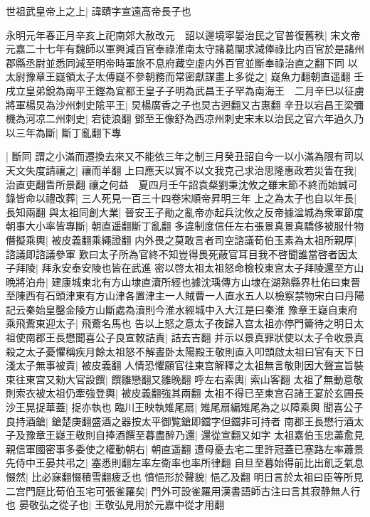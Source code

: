 世祖武皇帝上之上|{
	諱賾字宣遠高帝長子也}


永明元年春正月辛亥上祀南郊大赦改元　詔以邊境寜晏治民之官普復舊秩|{
	宋文帝元嘉二十七年有魏師以軍興減百官奉祿淮南太守諸葛闡求減俸祿比内百官於是諸州郡縣丞尉並悉同減至明帝時軍旅不息府藏空虛内外百官並斷奉祿治直之翻下同}
以太尉豫章王嶷領太子太傅嶷不參朝務而常密獻謀畫上多從之|{
	嶷魚力翻朝直遥翻}
壬戌立皇弟銳為南平王鏗為宜都王皇子子明為武昌王子罕為南海王　二月辛巳以征虜將軍楊炅為沙州刺史隂平王|{
	炅楊廣香之子也炅古迥翻又古惠翻}
辛丑以宕昌王梁彌機為河凉二州刺史|{
	宕徒浪翻}
鄧至王像舒為西凉州刺史宋末以治民之官六年過久乃以三年為斷|{
	斷丁亂翻下專}


|{
	斷同}
謂之小滿而遷換去來又不能依三年之制三月癸丑詔自今一以小滿為限有司以天文失度請禳之|{
	禳而羊翻}
上曰應天以實不以文我克己求治思隆惠政若災眚在我|{
	治直吏翻眚所景翻}
禳之何益　夏四月壬午詔袁粲劉秉沈攸之雖末節不終而始誠可錄皆命以禮改葬|{
	三人死見一百三十四卷宋順帝昇明三年}
上之為太子也自以年長|{
	長知兩翻}
與太祖同創大業|{
	晉安王子勛之亂帝亦起兵沈攸之反帝據湓城為衆軍節度}
朝事大小率皆專斷|{
	朝直遥翻斷丁亂翻}
多違制度信任左右張景真景真驕侈被服什物僭擬乘輿|{
	被皮義翻乘繩證翻}
内外畏之莫敢言者司空諮議荀伯玉素為太祖所親厚|{
	諮議即諮議參軍}
歎曰太子所為官終不知豈得畏死蔽官耳目我不啓聞誰當啓者因太子拜陵|{
	拜永安泰安陵也皆在武進}
密以啓太祖太祖怒命檢校東宫太子拜陵還至方山晩將泊舟|{
	建康城東北有方山埭直瀆所經也據沈瑀傳方山埭在湖熟縣界杜佑曰東晉至陳西有石頭津東有方山津各置津主一人賊曹一人直水五人以檢察禁物宋白曰丹陽記云秦始皇鑿金陵方山斷處為瀆則今淮水經城中入大江是曰秦淮}
豫章王嶷自東府乘飛鷰東迎太子|{
	飛鷰名馬也}
告以上怒之意太子夜歸入宫太祖亦停門籥待之明日太祖使南郡王長懋聞喜公子良宣敇詰責|{
	詰去吉翻}
并示以景真罪狀使以太子令收景真殺之太子憂懼稱疾月餘太祖怒不解晝卧太陽殿王敬則直入叩頭啟太祖曰官有天下日淺太子無事被責|{
	被皮義翻}
人情恐懼願官往東宫解釋之太祖無言敬則因大聲宣旨裝束往東宫又勑大官設饌|{
	饌雛戀翻又雛晚翻}
呼左右索輿|{
	索山客翻}
太祖了無動意敬則索衣被太祖仍牽強登輿|{
	被皮義翻強其兩翻}
太祖不得已至東宫召諸王宴於玄圃長沙王晃捉華蓋|{
	捉亦執也}
臨川王映執雉尾扇|{
	雉尾扇編雉尾為之以障乘輿}
聞喜公子良持酒鎗|{
	鎗楚庚翻盛酒之器按太平御覧鎗即鐺字但鐺非可持者}
南郡王長懋行酒太子及豫章王嶷王敬則自捧酒饌至暮盡醉乃還|{
	還從宣翻又如字}
太祖嘉伯玉忠藎愈見親信軍國密事多委使之權動朝右|{
	朝直遥翻}
遭母憂去宅二里許冠蓋已塞路左率蕭景先侍中王晏共弔之|{
	塞悉則翻左率左衛率也率所律翻}
自旦至暮始得前比出飢乏氣息惙然|{
	比必寐翻惙積雪翻疲乏也}
憤悒形於聲貌|{
	悒乙及翻}
明日言於太祖曰臣等所見二宫門庭比荀伯玉宅可張雀羅矣|{
	門外可設雀羅用漢書語師古注曰言其寂静無人行也}
晏敬弘之從子也|{
	王敬弘見用於元嘉中從才用翻}
